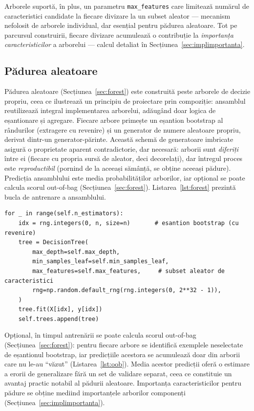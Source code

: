 \documentclass[12pt,a4paper]{report}
\begin{document}
Arborele suportă, în plus, un parametru \texttt{max\_features} care limitează numărul de
caracteristici candidate la fiecare divizare la un subset aleator --- mecanism nefolosit de arborele
individual, dar esențial pentru pădurea aleatoare. Tot pe parcursul construirii, fiecare divizare
acumulează o contribuție la \emph{importanța caracteristicilor} a arborelui --- calcul detaliat în
Secțiunea~\ref{sec:implimportanta}.

\subsection{Pădurea aleatoare}

Pădurea aleatoare (Secțiunea~\ref{sec:forest}) este construită peste arborele de decizie propriu,
ceea ce ilustrează un principiu de proiectare prin compoziție: ansamblul reutilizează integral
implementarea arborelui, adăugând doar logica de eșantionare și agregare. Fiecare arbore primește un
eșantion bootstrap al rândurilor (extragere cu revenire) și un generator de numere aleatoare
propriu, derivat dintr-un generator-părinte. Această schemă de generatoare imbricate asigură o
proprietate aparent contradictorie, dar necesară: arborii sunt \emph{diferiți} între ei (fiecare cu
propria sursă de aleator, deci decorelați), dar întregul proces este \emph{reproductibil} (pornind
de la aceeași sămânță, se obține aceeași pădure). Predicția ansamblului este media probabilităților
arborilor, iar opțional se poate calcula scorul out-of-bag (Secțiunea~\ref{sec:forest}).
Listarea~\ref{lst:forest} prezintă bucla de antrenare a ansamblului.

\begin{lstlisting}[caption={Antrenarea pe baza de bagging a padurii aleatoare.}, label={lst:forest}]
for _ in range(self.n_estimators):
    idx = rng.integers(0, n, size=n)       # esantion bootstrap (cu revenire)
    tree = DecisionTree(
        max_depth=self.max_depth,
        min_samples_leaf=self.min_samples_leaf,
        max_features=self.max_features,     # subset aleator de caracteristici
        rng=np.random.default_rng(rng.integers(0, 2**32 - 1)),
    )
    tree.fit(X[idx], y[idx])
    self.trees.append(tree)
\end{lstlisting}

Opțional, în timpul antrenării se poate calcula scorul out-of-bag (Secțiunea~\ref{sec:forest}):
pentru fiecare arbore se identifică exemplele neselectate de eșantionul bootstrap, iar predicțiile
acestora se acumulează doar din arborii care nu le-au ``văzut'' (Listarea~\ref{lst:oob}). Media
acestor predicții oferă o estimare a erorii de generalizare fără un set de validare separat, ceea ce
constituie un avantaj practic notabil al pădurii aleatoare. Importanța caracteristicilor pentru
pădure se obține mediind importanțele arborilor componenți (Secțiunea~\ref{sec:implimportanta}).
\end{document}
